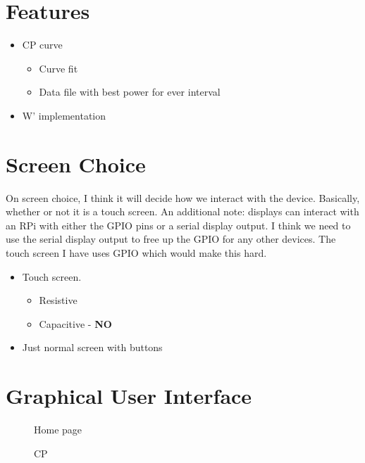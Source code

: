 \documentclass[letterpaper]{article}
\begin{document}
\section{Features}
\begin{itemize}
   \item CP curve
   \begin{itemize}
      \item Curve fit
      \item Data file with best power for ever interval
   \end{itemize}
   \item W' implementation
\end{itemize}



\section{Screen Choice}
On screen choice, I think it will decide how we interact with the device. Basically, whether or not it is a touch screen. An additional note: displays can interact with an RPi with either the GPIO pins or a serial display output. I think we need to use the serial display output to free up the GPIO for any other devices. The touch screen I have uses GPIO which would make this hard. 

\begin{itemize}
   \item Touch screen.
      \begin{itemize}
         \item Resistive
         \item Capacitive - \textbf{NO}
      \end{itemize}
   \item Just normal screen with buttons
\end{itemize}

\section{Graphical User Interface}

\begin{figure}[!htb]
\centering
\begin{minipage}{.49\textwidth}
\centering

\caption{Home page}
\end{minipage} \hfill
\begin{minipage}{.49\textwidth}
\centering

\caption{CP}
\end{minipage}
\end{figure}
\end{document}
